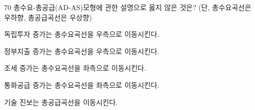\begin{question}{70}
총수요-총공급(AD-AS)모형에 관한 설명으로 옳지 않은 것은? (단, 총수요곡선은 우하향, 총공급곡선은 우상향)
\begin{choices}
  \item 독립투자 증가는 총수요곡선을 우측으로 이동시킨다.
  \item 정부지출 증가는 총수요곡선을 우측으로 이동시킨다.
  \item 조세 증가는 총수요곡선을 좌측으로 이동시킨다.
  \item 통화공급 증가는 총수요곡선을 좌측으로 이동시킨다.
  \item 기술 진보는 총공급곡선을 이동시킨다.
\end{choices}
\end{question}
